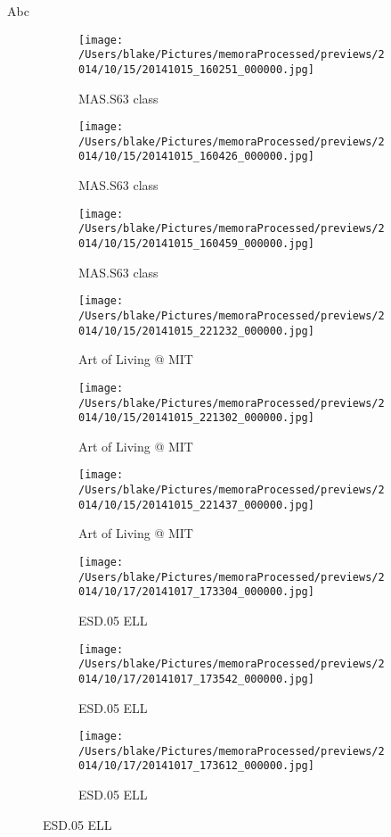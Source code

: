 \documentclass{article}
\begin{document}
Abc

\pagebreak[4]

\begin{figure}[h]
\centering

\begin{subfigure}{.25\textwidth}\centering\texttt{[image: /Users/blake/Pictures/memoraProcessed/previews/2014/10/15/20141015\_160251\_000000.jpg]}\caption{MAS.S63 class
}\end{subfigure}
\begin{subfigure}{.25\textwidth}\centering\texttt{[image: /Users/blake/Pictures/memoraProcessed/previews/2014/10/15/20141015\_160426\_000000.jpg]}\caption{MAS.S63 class
}\end{subfigure}
\begin{subfigure}{.25\textwidth}\centering\texttt{[image: /Users/blake/Pictures/memoraProcessed/previews/2014/10/15/20141015\_160459\_000000.jpg]}\caption{MAS.S63 class
}\end{subfigure}




\begin{subfigure}{.25\textwidth}\centering\texttt{[image: /Users/blake/Pictures/memoraProcessed/previews/2014/10/15/20141015\_221232\_000000.jpg]}\caption{Art of Living @ MIT
}\end{subfigure}
\begin{subfigure}{.25\textwidth}\centering\texttt{[image: /Users/blake/Pictures/memoraProcessed/previews/2014/10/15/20141015\_221302\_000000.jpg]}\caption{Art of Living @ MIT
}\end{subfigure}
\begin{subfigure}{.25\textwidth}\centering\texttt{[image: /Users/blake/Pictures/memoraProcessed/previews/2014/10/15/20141015\_221437\_000000.jpg]}\caption{Art of Living @ MIT
}\end{subfigure}

\begin{subfigure}{.25\textwidth}\centering\texttt{[image: /Users/blake/Pictures/memoraProcessed/previews/2014/10/17/20141017\_173304\_000000.jpg]}\caption{ESD.05 ELL
}\end{subfigure}
\begin{subfigure}{.25\textwidth}\centering\texttt{[image: /Users/blake/Pictures/memoraProcessed/previews/2014/10/17/20141017\_173542\_000000.jpg]}\caption{ESD.05 ELL
}\end{subfigure}
\begin{subfigure}{.25\textwidth}\centering\texttt{[image: /Users/blake/Pictures/memoraProcessed/previews/2014/10/17/20141017\_173612\_000000.jpg]}\caption{ESD.05 ELL
}\end{subfigure}

\end{figure}
\end{document}
